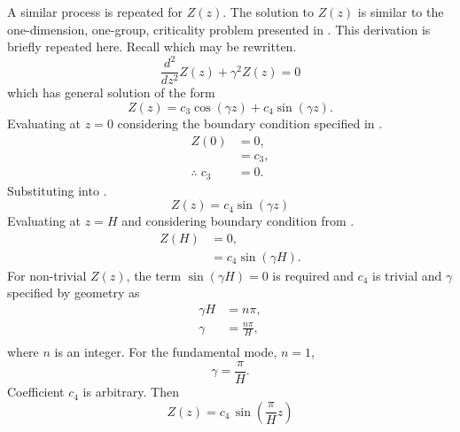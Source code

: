   A similar process is repeated for $Z(z)$. The solution to $Z(z)$ is similar to
  the one-dimension, one-group, criticality problem presented in
  . This derivation is briefly repeated here. Recall
   which may be rewritten.
  \begin{equation}
    \frac{d^2}{dz^2} Z(z) + \gamma^2 Z(z) = 0
  \end{equation}
  which has general solution of the form
  \begin{equation}
    \label{eq:finite_cyl_z_general}
    Z(z) = c_3 \cos(\gamma z) + c_4 \sin(\gamma z).
  \end{equation}
  Evaluating  at $z=0$ considering the boundary
  condition specified in .
  \begin{align}
    Z(0) &= 0, \\
    &= c_3, \\
    \label{eq:finite_cyl_c3}
    \therefore \; c_3 &= 0.
  \end{align}
  Substituting  into .
  \begin{equation}
    \label{eq:finite_cyl_z_sin}
    Z(z) = c_4 \sin(\gamma z)
  \end{equation}
  Evaluating  at $z=H$ and considering boundary
  condition from .
  \begin{align}
    Z(H) &= 0, \\
    &= c_4 \sin(\gamma H).
  \end{align}
  For non-trivial $Z(z)$, the term $\sin(\gamma H)=0$ is required and $c_4$ is
  trivial and $\gamma$ specified by geometry as
  \begin{align}
    \gamma H &= n \pi, \\
    \gamma &= \frac{n \pi}{H}, \\
  \end{align}
  where $n$ is an integer. For the fundamental mode, $n=1$,
  \begin{equation}
    \label{eq:finite_cyl_gamma}
    \gamma = \frac{\pi}{H}.
  \end{equation}
  Coefficient $c_4$ is arbitrary. Then
  \begin{equation}
    \label{eq:finite_cyl_Z}
    Z(z) = c_4 \, \sin\left(\frac{\pi}{H} z\right)
  \end{equation}

